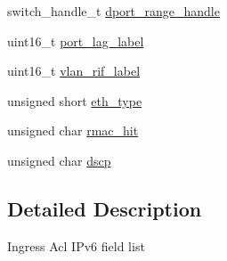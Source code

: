 \begin{DoxyCompactItemize}
\item 
switch\+\_\+handle\+\_\+t \hyperlink{unionswitch__acl__ipv6__value___a88a8878c8a0d606f3ad62ed75cdf82cb}{dport\+\_\+range\+\_\+handle}
\item 
uint16\+\_\+t \hyperlink{unionswitch__acl__ipv6__value___a4e34efa475316e629f156b7f2b7292fa}{port\+\_\+lag\+\_\+label}
\item 
uint16\+\_\+t \hyperlink{unionswitch__acl__ipv6__value___add994f866b937fc043a2b575c106115c}{vlan\+\_\+rif\+\_\+label}
\item 
unsigned short \hyperlink{unionswitch__acl__ipv6__value___af908fd9c3046ebd0a9b0fbcce63ae0ac}{eth\+\_\+type}
\item 
unsigned char \hyperlink{unionswitch__acl__ipv6__value___a7f8d7fa2eb138467c3938e0f99e584a0}{rmac\+\_\+hit}
\item 
unsigned char \hyperlink{unionswitch__acl__ipv6__value___af019dc65dfac441baaeaf708fea3de58}{dscp}
\end{DoxyCompactItemize}


\subsection{Detailed Description}
Ingress Acl I\+Pv6 field list 

